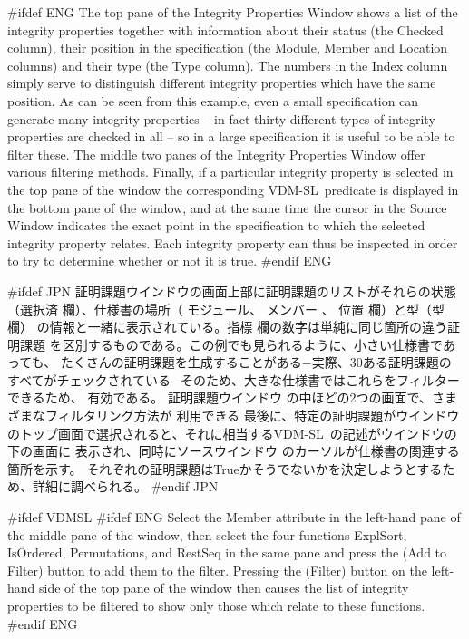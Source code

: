 \documentclass[\pformat,12pt]{article}
\newcommand{\vdmslpp}{VDM-SL}
\newcommand{\vdmslpp}{VDM++}
\newcommand{\guicmd}[1]{{\sf #1}}
\newcommand{\guicmd}[1]{{\gt #1}}
\begin{document}
#ifdef ENG
The top pane of the \guicmd{Integrity Properties Window} shows a list
of the integrity properties together with information about their
status (the \guicmd{Checked} column), their position in the specification (the
\guicmd{Module}, \guicmd{Member} and \guicmd{Location} columns) and
their type (the \guicmd{Type} column). The numbers in the
\guicmd{Index} column simply serve to distinguish different integrity
properties which have the same position. As can be seen from this
example, even a small specification can generate many integrity
properties -- in fact thirty different types of integrity properties
are checked in all -- so in a large specification it is useful to be
able to filter these. The middle two panes of the \guicmd{Integrity
  Properties Window} offer various filtering
methods. Finally, if a particular integrity 
property is selected in the top pane of the window the corresponding
\vdmslpp\ predicate is displayed in the bottom pane of the window, and
at the same time the cursor in the \guicmd{Source Window} indicates
the exact point in the specification to which the selected integrity
property relates. Each integrity property can thus be inspected in
order to try to determine whether or not it is true.
#endif ENG

#ifdef JPN
\guicmd{証明課題ウインドウ}の画面上部に証明課題のリストがそれらの状態
（\guicmd{選択済} 欄）、仕様書の場所（
\guicmd{モジュール}、 \guicmd{メンバー} 、 \guicmd{位置} 欄）と型（\guicmd{型}欄）
の情報と一緒に表示されている。\guicmd{指標} 欄の数字は単純に同じ箇所の違う証明課題
を区別するものである。この例でも見られるように、小さい仕様書であっても、
たくさんの証明課題を生成することがある−実際、30ある証明課題の
すべてがチェックされている−そのため、大きな仕様書ではこれらをフィルターできるため、
有効である。
\guicmd{証明課題ウインドウ} の中ほどの2つの画面で、さまざまなフィルタリング方法が
利用できる
最後に、特定の証明課題がウインドウ
のトップ画面で選択されると、それに相当する\vdmslpp\ の記述がウインドウの下の画面に
表示され、同時に\guicmd{ソースウインドウ} のカーソルが仕様書の関連する箇所を示す。
それぞれの証明課題はTrueかそうでないかを決定しようとするため、詳細に調べられる。
#endif JPN

#ifdef VDMSL
#ifdef ENG
Select the \guicmd{Member} attribute in the left-hand pane of the
middle pane of the window, then select the four functions
\guicmd{ExplSort}, \guicmd{IsOrdered}, \guicmd{Permutations}, and
\guicmd{RestSeq} in the same pane and press the
(\guicmd{Add to Filter}) button to add them to the filter. Pressing the 
(\guicmd{Filter}) button on the left-hand side of the top pane of
the window then causes the list of integrity properties to be filtered
to show only those which relate to these functions.
#endif ENG
\end{document}
